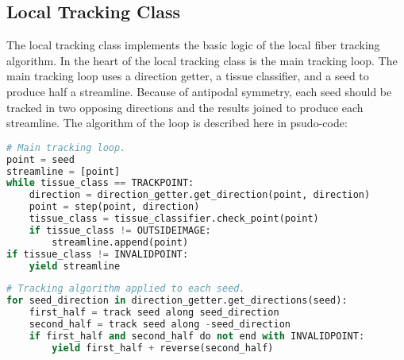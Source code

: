 \subsection{Local Tracking Class}
    The local tracking class implements the basic logic of the local fiber tracking algorithm. In the heart of the local tracking class is the main tracking loop. The main tracking loop uses a direction getter, a tissue classifier, and a seed to produce half a streamline. Because of antipodal symmetry, each seed should be tracked in two opposing directions and the results joined to produce each streamline. The algorithm of the loop is described here in psudo-code:
\begin{lstlisting}[language=python]
# Main tracking loop.
point = seed
streamline = [point]
while tissue_class == TRACKPOINT:
    direction = direction_getter.get_direction(point, direction)
    point = step(point, direction)
    tissue_class = tissue_classifier.check_point(point)
    if tissue_class != OUTSIDEIMAGE:
        streamline.append(point)
if tissue_class != INVALIDPOINT:
    yield streamline
\end{lstlisting}

\begin{lstlisting}[language=python]
# Tracking algorithm applied to each seed.
for seed_direction in direction_getter.get_directions(seed):
    first_half = track seed along seed_direction
    second_half = track seed along -seed_direction
    if first_half and second_half do not end with INVALIDPOINT:
        yield first_half + reverse(second_half)
\end{lstlisting}
